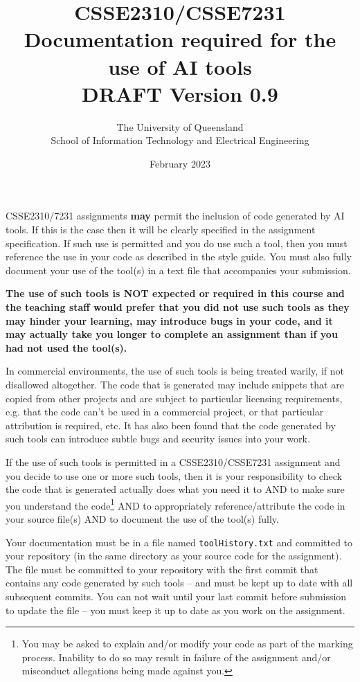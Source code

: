 \documentclass{article}
\title{CSSE2310/CSSE7231\\Documentation required for the use of AI tools\\DRAFT Version 0.9}
\author{The University of Queensland\\School of Information Technology and Electrical Engineering}
\date{February 2023}
\begin{document}
\maketitle
\thispagestyle{plain}
\linenumbers

CSSE2310/7231 assignments \textbf{may} permit the inclusion of code generated by AI tools. If this is the case
then it will be clearly specified in the assignment specification. If such use is permitted and you do use such a tool, 
then you must reference the use in your code as described in the style guide. You must also fully document your use 
of the tool(s) in a text file that accompanies your submission.

\textbf{The use of such tools is NOT expected or required in this course and the teaching staff would prefer that you did
not use such tools as they may hinder your learning, may introduce bugs in your code, and it may actually take
you longer to complete an assignment than if you had not used the tool(s).}

In commercial environments, the use of such tools is being treated warily, if not disallowed altogether. The code that 
is generated may include snippets that are copied from other projects and are subject to particular licensing requirements, 
e.g. that the code can't be used in a commercial project, or that particular attribution is required, etc. It has also been found 
that the code generated by such tools can introduce subtle bugs and security issues into your work. 

If the use of such tools is permitted in a CSSE2310/CSSE7231 assignment and you decide to use one or more such tools, then it is your responsibility
to check the code that is generated actually does what you need it to AND to make sure you understand the code\footnote{You may be asked to explain and/or 
modify your code as part of the marking process. Inability to do so may result in failure of the assignment and/or misconduct 
allegations being made against you.} AND to appropriately reference/attribute the code in your source file(s) 
AND to document the use of the tool(s) fully.

Your documentation must be in a file named \texttt{toolHistory.txt} and committed to your repository (in the same directory as your 
source code for the assignment). The file must be committed to your repository with the first commit that contains any code generated
by such tools -- and must be kept up to date with all subsequent commits. You can not wait until your last commit before submission
to update the file -- you must keep it up to date as you work on the assignment.
\end{document}
